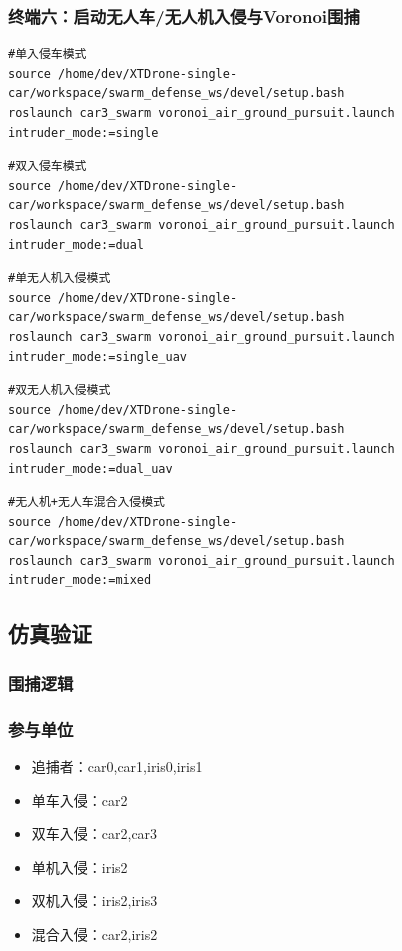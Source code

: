 \subsubsection{终端六：启动无人车/无人机入侵与Voronoi围捕}
\begingroup\scriptsize
\begin{verbatim}
#单入侵车模式
source /home/dev/XTDrone-single-car/workspace/swarm_defense_ws/devel/setup.bash
roslaunch car3_swarm voronoi_air_ground_pursuit.launch intruder_mode:=single
\end{verbatim}
\begin{verbatim}
#双入侵车模式
source /home/dev/XTDrone-single-car/workspace/swarm_defense_ws/devel/setup.bash
roslaunch car3_swarm voronoi_air_ground_pursuit.launch intruder_mode:=dual
\end{verbatim}
\begin{verbatim}
#单无人机入侵模式
source /home/dev/XTDrone-single-car/workspace/swarm_defense_ws/devel/setup.bash
roslaunch car3_swarm voronoi_air_ground_pursuit.launch intruder_mode:=single_uav
\end{verbatim}
\begin{verbatim}
#双无人机入侵模式
source /home/dev/XTDrone-single-car/workspace/swarm_defense_ws/devel/setup.bash
roslaunch car3_swarm voronoi_air_ground_pursuit.launch intruder_mode:=dual_uav
\end{verbatim}
\begin{verbatim}
#无人机+无人车混合入侵模式
source /home/dev/XTDrone-single-car/workspace/swarm_defense_ws/devel/setup.bash
roslaunch car3_swarm voronoi_air_ground_pursuit.launch intruder_mode:=mixed
\end{verbatim}  
\endgroup

\subsection{仿真验证}
\subsubsection{围捕逻辑}
\subsubsection{参与单位}
\begin{itemize}
\item 追捕者：car0,car1,iris0,iris1
\item 单车入侵：car2
\item 双车入侵：car2,car3
\item 单机入侵：iris2
\item 双机入侵：iris2,iris3
\item 混合入侵：car2,iris2
\end{itemize}


